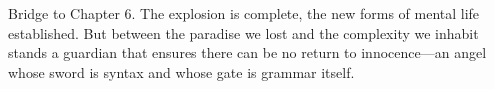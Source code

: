 \bigskip
\noindent Bridge to Chapter 6. The explosion is complete, the new forms of mental life established. But between the paradise we lost and the complexity we inhabit stands a guardian that ensures there can be no return to innocence—an angel whose sword is syntax and whose gate is grammar itself.
